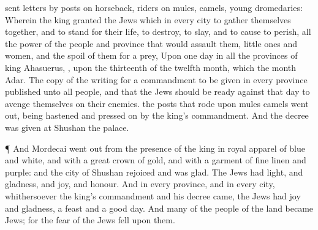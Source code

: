 {sent
letters
by
posts on
horseback,
{}
riders on
mules,
camels,
{}
young
dromedaries:
Wherein the
king
granted the
Jews which
{} in every
city to gather themselves
together, and to
stand for their
life, to
destroy, to
slay, and to cause to
perish, all the
power of the
people and
province that would
assault them,
{} little
ones and
women, and
{} the
spoil of them for a
prey,
Upon
one
day in all the
provinces of
king
Ahasuerus,
{}, upon the
thirteenth
{} of the
twelfth
month, which
{} the
month
Adar.
The
copy of the
writing for a
commandment to be
given in every
province
{}
published unto all
people, and that the
Jews should be
ready against that
day to
avenge themselves on their
enemies.
 the
posts that
rode upon
mules
{}
camels went
out, being
hastened and pressed
on by the
king’s
commandment. And the
decree was
given at
Shushan the
palace.
\par }{\PP {}¶ And
Mordecai went
out from the
presence of the
king in
royal
apparel of
blue and
white, and with a
great
crown of
gold, and with a
garment of fine
linen and
purple: and the
city of
Shushan
rejoiced and was
glad.
The
Jews had
light, and
gladness, and
joy, and
honour.
And in every
province, and in every
city,
whithersoever the
king’s
commandment and his
decree
came, the
Jews had
joy and
gladness, a
feast and a
good
day. And
many of the
people of the
land became
Jews; for the
fear of the
Jews
fell upon them.

}
